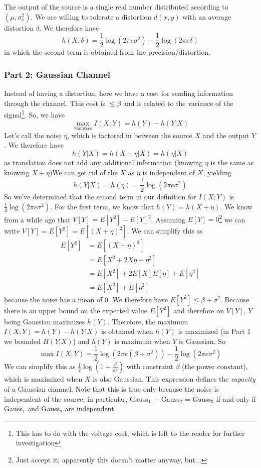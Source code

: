 \documentclass[11pt]{article}
\theoremstyle{definition}
\begin{document}
The output of the source is a single real number distributed according to $(\mu, \sigma_x^2)$. We are willing to tolerate a distortion $d(x,y)$ with an average distortion $\delta$. We therefore have $$h(X, \delta) = \frac{1}{2}\log(2\pi e \sigma^2) - \frac{1}{2} \log(2 \pi e \delta)$$in which the second term is obtained from the precision/distortion. 

\subsubsection{Part 2: Gaussian Channel}

Instead of having a distortion, here we have a cost for sending information through the channel. This cost is $\leq \beta$ and is related to the variance of the signal\footnote{This has to do with the voltage cost, which is left to the reader for further investigation}. So, we have $$\max_{\forall \text{sources}} I(X;Y) = h(Y) - h(Y|X)$$Let's call the noise $\eta$, which is factored in between the source $X$ and the output $Y$. We therefore have $$h(Y|X) = h(X+\eta | X) = h(\eta | X)$$as translation does not add any additional information (knowing $\eta$ is the same as knowing $X + \eta$)We can get rid of the $X$ as $\eta$ is independent of $X$, yielding $$h(Y|X) = h(\eta) = \frac{1}{2}\log(2\pi e \sigma^2)$$So we've determined that the second term in our definition for $I(X;Y)$ is $\frac{1}{2} \log (2 \pi e \sigma^2)$. For the first term, we know that $h(Y) = h(X+\eta)$. We know from a while ago that $V[Y] = E[Y^2] - E[Y]^2$. Assuming $E[Y] = 0$\footnote{Just accept it; apparently this doesn't matter anyway, but...} we can write $V[Y] = E[Y^2] = E[(X + \eta)^2]$. We can simplify this as \begin{align*}
E[Y^2] &= E[(X + \eta)^2] \\
	&= E[X^2 + 2X\eta + \eta^2] \\
	&= E[X^2] + 2E[X]E[\eta] + E[\eta^2] \\
	&= E[X^2] + E[\eta^2]
\end{align*}
because the noise has a mean of 0. We therefore have $E[Y^2] \leq \beta + \sigma^2$. Because there is an upper bound on the expected value $E[Y^2]$ and therefore on $V[Y]$, $Y$ being Gaussian maximizes $h(Y)$. Therefore, the maximum $I(X;Y) = h(Y) - h(Y|X)$ is obtained when $h(Y)$ is maximized (in Part 1 we bounded $H(Y|X)$) and $h(Y)$ is maximum when $Y$ is Gaussian. So $$\max I(X;Y) = \frac{1}{2}\log(2\pi e (\beta + \sigma^2)) - \frac{1}{2} \log (2 \pi e \sigma^2)$$We can simplify this as $\frac{1}{2} \log (1 + \frac{\beta}{\sigma^2})$ with constraint $\beta$ (the power constant), which is maximized when $X$ is also Gaussian. This expression defines the \textit{capacity} of a Gaussian channel. Note that this is true only because the noise is independent of the source; in particular, Gauss$_1$ + Gauss$_2$ = Gauss$_3$ if and only if Gauss$_1$ and Gauss$_2$ are independent. 
\end{document}
